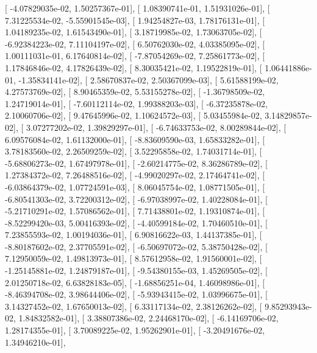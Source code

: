 \documentclass{article}
\begin{document}
       [ -4.07829035e-02,   1.50257367e-01],
       [  1.08390741e-01,   1.51931026e-01],
       [  7.31225534e-02,  -5.55901545e-03],
       [  1.94254827e-03,   1.78176131e-01],
       [  1.04189235e-02,   1.61543490e-01],
       [  3.18719985e-02,   1.73063705e-02],
       [ -6.92384223e-02,   7.11104197e-02],
       [  6.50762030e-02,   4.03385095e-02],
       [  1.00111031e-01,   6.17640814e-02],
       [ -7.87054269e-02,   7.25861773e-02],
       [  1.17846846e-02,   4.17826439e-02],
       [  8.30035421e-02,   1.19522819e-01],
       [  1.06441886e-01,  -1.35834141e-02],
       [  2.58670837e-02,   2.50367099e-03],
       [  5.61588199e-02,   4.27573769e-02],
       [  8.90465359e-02,   5.53155278e-02],
       [ -1.36798509e-02,   1.24719014e-01],
       [ -7.60112114e-02,   1.99388203e-03],
       [ -6.37235878e-02,   2.10060706e-02],
       [  9.47645996e-02,   1.10624572e-03],
       [  5.03455984e-02,   3.14829857e-02],
       [  3.07277202e-02,   1.39829297e-01],
       [ -6.74633753e-02,   8.00289844e-02],
       [  6.09576084e-02,   1.61132000e-01],
       [ -8.83609590e-03,   1.65833282e-01],
       [  3.78183560e-02,   2.26509259e-02],
       [  3.52295858e-02,   1.74031714e-01],
       [ -5.68806273e-02,   1.67497978e-01],
       [ -2.60214775e-02,   8.36286789e-02],
       [  1.27384372e-02,   7.26488516e-02],
       [ -4.99020297e-02,   2.17464741e-02],
       [ -6.03864379e-02,   1.07724591e-03],
       [  8.06045754e-02,   1.08771505e-01],
       [ -6.80541303e-02,   3.72200312e-02],
       [ -6.97038997e-02,   1.40228084e-01],
       [ -5.21710291e-02,   1.57086562e-01],
       [  7.71438801e-02,   1.19310874e-01],
       [ -8.52299420e-03,   5.00416393e-02],
       [ -4.40599184e-02,   1.70460510e-01],
       [  7.23855593e-02,   1.00194036e-01],
       [  6.90816622e-03,   1.44137385e-01],
       [ -8.80187602e-02,   2.37705591e-02],
       [ -6.50697072e-02,   5.38750428e-02],
       [  7.12950059e-02,   1.49813973e-01],
       [  8.57612958e-02,   1.91560001e-02],
       [ -1.25145881e-02,   1.24879187e-01],
       [ -9.54380155e-03,   1.45269505e-02],
       [  2.01250718e-02,   6.63828183e-05],
       [ -1.68856251e-04,   1.46098986e-01],
       [ -8.46394708e-02,   3.98644406e-02],
       [ -5.93943415e-02,   1.03996675e-01],
       [  3.14327452e-02,   1.67650013e-02],
       [  6.33117134e-02,   2.38126262e-02],
       [  9.85293943e-02,   1.84832582e-01],
       [  3.38807386e-02,   2.24468170e-02],
       [ -6.14169706e-02,   1.28174355e-01],
       [  3.70089225e-02,   1.95262901e-01],
       [ -3.20491676e-02,   1.34946210e-01],
\end{document}
